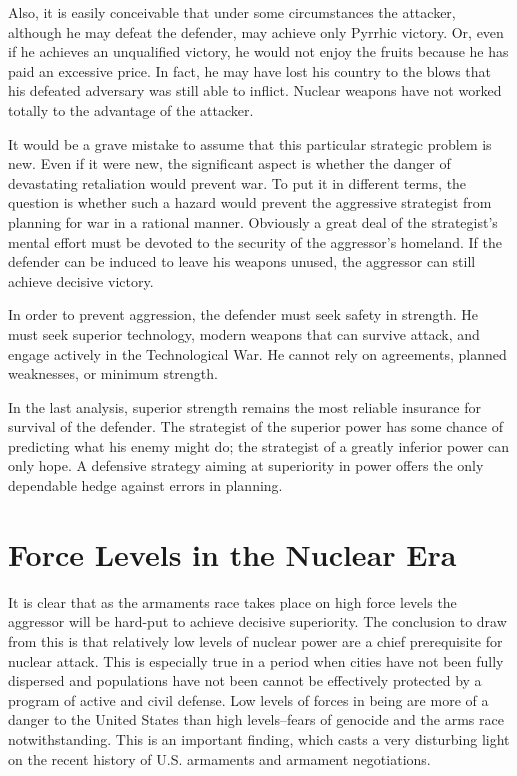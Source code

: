 Also, it is easily conceivable that under some circumstances the attacker, although he may defeat the defender, may achieve only Pyrrhic victory. Or, even if he achieves an unqualified victory, he would not enjoy the fruits because he has paid an excessive price. In fact, he may have lost his country to the blows that his defeated adversary was still able to inflict. Nuclear weapons have not worked totally to the advantage of the attacker.

It would be a grave mistake to assume that this particular strategic problem is new. Even if it were new, the significant aspect is whether the danger of devastating retaliation would prevent war. To put it in different terms, the question is whether such a hazard would prevent the aggressive strategist from planning for war in a rational manner. Obviously a great deal of the strategist's mental effort must be devoted to the security of the aggressor's homeland. If the defender can be induced to leave his weapons unused, the aggressor can still achieve decisive victory.

In order to prevent aggression, the defender must seek safety in strength. He must seek superior technology, modern weapons that can survive attack, and engage actively in the Technological War. He cannot rely on agreements, planned weaknesses, or minimum strength.

In the last analysis, superior strength remains the most reliable insurance for survival of the defender. The strategist of the superior power has some chance of predicting what his enemy might do; the strategist of a greatly inferior power can only hope. A defensive strategy aiming at superiority in power offers the only dependable hedge against errors in planning.

\section{Force Levels in the Nuclear Era}
It is clear that as the armaments race takes place on high force levels the aggressor will be hard-put to achieve decisive superiority. The conclusion to draw from this is that relatively low levels of nuclear power are a chief prerequisite for nuclear attack. This is especially true in a period when cities have not been fully dispersed and populations have not been cannot be effectively protected by a program of active and civil defense. Low levels of forces in being are more of a danger to the United States than high levels--fears of genocide and the arms race notwithstanding. This is an important finding, which casts a very disturbing light on the recent history of U.S. armaments and armament negotiations.

